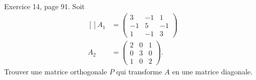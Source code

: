 \begin{exercice}\label{exoLineraire0037}

	Exercice 14, page 91. Soit 
	\begin{equation}
		\begin{aligned}[]
			A_1&=\begin{pmatrix}
				3	&	-1	&	1\\ 
				-1	&	5	&	-1\\ 
				1	&	-1	&	3	  
			\end{pmatrix}\\
			A_2&=\begin{pmatrix}
				2	&	0	&	1\\ 
				0	&	3	&	0\\ 
				1	&	0	&	2	  
			\end{pmatrix}.
		\end{aligned}
	\end{equation}
	Trouver une matrice orthogonale $P$ qui transforme $A$ en une matrice diagonale.

\end{exercice}
